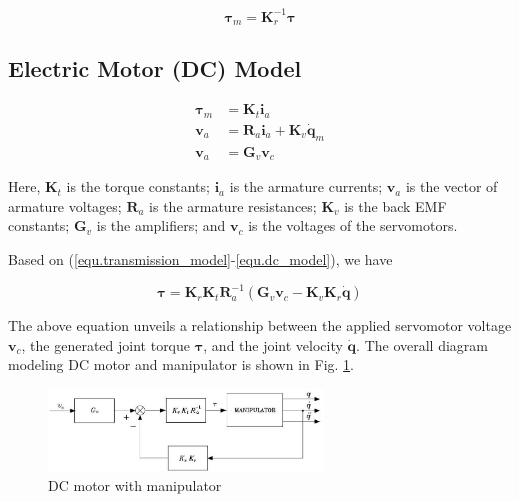 \documentclass[10pt]{article}
\begin{document}
\begin{equation}\label{equ.transmission_model2}
\boldsymbol{\tau}_{m}=\boldsymbol{K}_{r}^{-1} \boldsymbol{\tau}
\end{equation}

\subsection{Electric Motor (DC) Model}

\begin{equation}\label{equ.dc_model}
    \begin{aligned}
 \boldsymbol{\tau}_m& =\boldsymbol{K}_{t} \boldsymbol{i}_{a} \\
\boldsymbol{v}_{a} & =\boldsymbol{R}_{a} \boldsymbol{i}_{a}+\boldsymbol{K}_{v} \dot{\boldsymbol{q}}_{m} \\
\boldsymbol{v}_{a} & =\boldsymbol{G}_{v} \boldsymbol{v}_{c}
\end{aligned}
\end{equation}

Here, $\boldsymbol{K}_{t}$ is the torque constants;  $\boldsymbol{i}_{a}$ is the  armature currents; $ \boldsymbol{v}_{a}$ is the vector of armature voltages; $\boldsymbol{R}_{a}$ is the  armature resistances; $\boldsymbol{K}_{v}$ is the back EMF constants; $\boldsymbol{G}_{v}$ is the amplifiers; and $\boldsymbol{v}_{c}$ is the voltages of the servomotors.

Based on (\ref{equ.transmission_model}-\ref{equ.dc_model}), we have

\begin{equation}\label{equ.voltage_control}
    \boldsymbol{\tau}=\boldsymbol{K}_{r} \boldsymbol{K}_{t} \boldsymbol{R}_{a}^{-1}\left(\boldsymbol{G}_{v} \boldsymbol{v}_{c}-\boldsymbol{K}_{v} \boldsymbol{K}_{r} \dot{\boldsymbol{q}}\right) 
\end{equation}

The above equation unveils a relationship between the applied servomotor voltage $\boldsymbol{v}_c$, the generated joint torque $\boldsymbol{\tau}$, and the joint velocity $\boldsymbol{\dot{q}}$. The overall  diagram modeling DC motor and manipulator is shown in Fig. \ref{fig.voltage_control}.


\begin{figure}[H]
    \centering
    \includegraphics[max width=0.65\textwidth]{control/voltage_control.jpg}
    \caption{DC motor with manipulator}
    \label{fig.voltage_control}
\end{figure}
\end{document}
